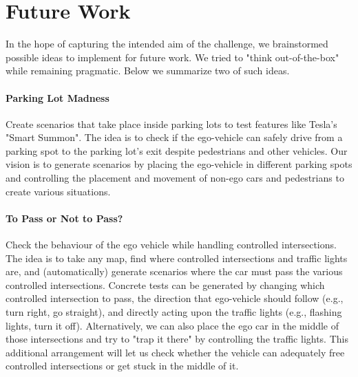 \documentclass[conference]{IEEEtran}
\begin{document}
\section{Future Work}

In the hope of capturing the intended aim of the challenge, we brainstormed possible ideas to implement for future work. We tried to "think out-of-the-box" while remaining pragmatic. Below we summarize two of such ideas.

\paragraph{Parking Lot Madness}
Create scenarios that take place inside parking lots to test features like Tesla's "Smart Summon". The idea is to check if the ego-vehicle can safely drive from a parking spot to the parking lot's exit despite pedestrians and other vehicles. Our vision is to generate scenarios by placing the ego-vehicle in different parking spots and controlling the placement and movement of non-ego cars and pedestrians to create various situations.

\paragraph{To Pass or Not to Pass?}
Check the behaviour of the ego vehicle while handling controlled intersections. The idea is to take any map, find where controlled intersections and traffic lights are, and (automatically) generate scenarios where the car must pass the various controlled intersections.
%
Concrete tests can be generated by changing which controlled intersection to pass, the direction that ego-vehicle should follow (e.g., turn right, go straight), and directly acting upon the traffic lights (e.g., flashing lights, turn it off).
%
Alternatively, we can also place the ego car in the middle of those intersections and try to "trap it there" by controlling the traffic lights. This additional arrangement will let us check whether the vehicle can adequately free controlled intersections or get stuck in the middle of it.



\end{document}
